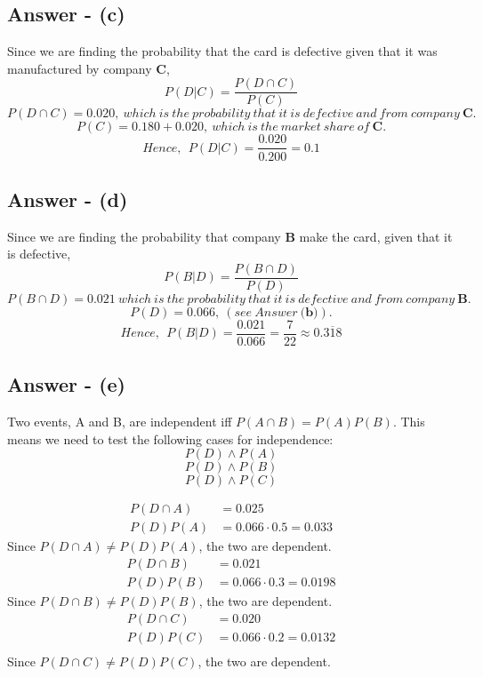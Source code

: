 \documentclass{article}
\newcommand\ddfrac[2]{\frac{\displaystyle #1}{\displaystyle #2}}
\begin{document}
\subsection{Answer - (c)}
Since we are finding the probability that the card is defective given that it was manufactured by company \textbf{C}, \\
$$P(D|C) = \ddfrac{P(D\cap C)}{P(C)}$$
$$P(D\cap C) = 0.020,\ which\ is\ the\ probability\ that\ it\ is\ defective\ and\ from\ company\ \textbf{C}.$$
$$P(C) = 0.180 + 0.020,\ which\ is\ the\ market\ share\ of\ \textbf{C}.$$
$$Hence,\ \ P(D|C) = \ddfrac{0.020}{0.200} = 0.1$$

\newpage
\subsection{Answer - (d)}
Since we are finding the probability that company \textbf{B} make the card, given that it is defective, \\
$$P(B|D) = \ddfrac{P(B\cap D)}{P(D)}$$
$$P(B\cap D) = 0.021\ which\ is\ the\ probability\ that\ it\ is\ defective\ and\ from\ company\ \textbf{B}.$$
$$P(D) = 0.066,\ (see\ Answer\ \textbf{(b)}).$$
$$Hence,\ \ P(B|D) = \ddfrac{0.021}{0.066} = \ddfrac{7}{22} \approx 0.\overline{318} $$

\subsection{Answer - (e)}
Two events, A and B, are independent iff $P(A\cap B) = P(A)P(B)$.
This means we need to test the following cases for independence:
$$P(D) \land P(A)$$
$$P(D) \land P(B)$$
$$P(D) \land P(C)$$

\begin{align*}
P(D\cap A) &= 0.025 \\
P(D)P(A) &= 0.066 \cdot 0.5 = 0.033
\end{align*}
Since $P(D\cap A) \neq P(D)P(A)$, the two are dependent.
\\

\begin{align*}
P(D\cap B) &= 0.021 \\
P(D)P(B) &= 0.066 \cdot 0.3 = 0.0198
\end{align*}
Since $P(D\cap B) \neq P(D)P(B)$, the two are dependent.
\\

\begin{align*}
P(D\cap C) &= 0.020 \\
P(D)P(C) &= 0.066 \cdot 0.2 = 0.0132 \\ 
\end{align*}
Since $P(D\cap C) \neq P(D)P(C)$, the two are dependent.
\\
\end{document}
